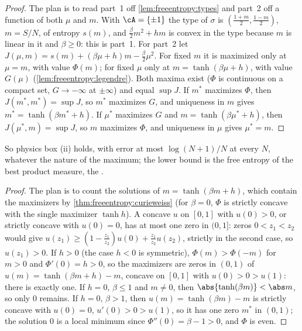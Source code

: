 \begin{refsection}
\begin{proof}
The plan is to read part~1 off \cref{lem:freeentropy:types} and part~2 off a function of both $\mu$ and $m$. With $\cA=\{\pm1\}$ the type of $\sigma$ is $(\frac{1+m}2,\frac{1-m}2)$, $m=S/N$, of entropy $s(m)$, and $\frac\beta2m^2+hm$ is convex in the type because $m$ is linear in it and $\beta\ge0$: this is part~1. For part~2 let $J(\mu,m)=s(m)+(\beta\mu+h)m-\frac\beta2\mu^2$. For fixed $m$ it is maximized only at $\mu=m$, with value $\Phi(m)$; for fixed $\mu$ only at $m=\tanh(\beta\mu+h)$, with value $G(\mu)$ (\cref{lem:freeentropy:legendre}). Both maxima exist ($\Phi$ is continuous on a compact set, $G\to-\infty$ at $\pm\infty$) and equal $\sup J$. If $m^*$ maximizes $\Phi$, then $J(m^*,m^*)=\sup J$, so $m^*$ maximizes $G$, and uniqueness in $m$ gives $m^*=\tanh(\beta m^*+h)$. If $\mu^*$ maximizes $G$ and $m=\tanh(\beta\mu^*+h)$, then $J(\mu^*,m)=\sup J$, so $m$ maximizes $\Phi$, and uniqueness in $\mu$ gives $\mu^*=m$.
\end{proof}

So physics box (ii) holds, with error at most $\log(N+1)/N$ at every $N$, whatever the nature of the maximum; the lower bound is the free entropy of the best product measure, the .


\begin{proof}
The plan is to count the solutions of $m=\tanh(\beta m+h)$, which contain the maximizers by \cref{thm:freeentropy:curieweiss} (for $\beta=0$, $\Phi$ is strictly concave with the single maximizer $\tanh h$). A concave $u$ on $[0,1]$ with $u(0)>0$, or strictly concave with $u(0)=0$, has at most one zero in $(0,1]$: zeros $0<z_1<z_2$ would give $u(z_1)\ge(1-\frac{z_1}{z_2})u(0)+\frac{z_1}{z_2}u(z_2)$, strictly in the second case, so $u(z_1)>0$. If $h>0$ (the case $h<0$ is symmetric), $\Phi(m)>\Phi(-m)$ for $m>0$ and $\Phi'(0)=h>0$, so the maximizers are zeros in $(0,1)$ of $u(m)=\tanh(\beta m+h)-m$, concave on $[0,1]$ with $u(0)>0>u(1)$: there is exactly one. If $h=0$, $\beta\le1$ and $m\ne0$, then $\abs{\tanh(\beta m)}<\abs m$, so only $0$ remains. If $h=0$, $\beta>1$, then $u(m)=\tanh(\beta m)-m$ is strictly concave with $u(0)=0$, $u'(0)>0>u(1)$, so it has one zero $m^*$ in $(0,1)$; the solution $0$ is a local minimum since $\Phi''(0)=\beta-1>0$, and $\Phi$ is even.
\end{proof}


\end{refsection}
